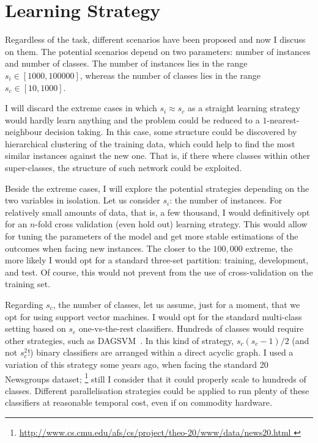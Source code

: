 \documentclass[11pt]{article}
\begin{document}
\section{Learning Strategy}
\label{sec:learning}
Regardless of the task, different scenarios have been proposed and now I discuss 
on them. The potential scenarios depend on two parameters: number of instances 
and number of classes. The number of instances lies in the range $s_i\in [1000, 
100000]$, whereas the number of classes lies in the range $s_c\in [10, 1000]$. 

I will discard the extreme cases in which $s_i\approx s_c$ as a straight 
learning strategy would hardly learn anything and the problem could be reduced 
to a $1$-nearest-neighbour decision taking. In this case, some structure could 
be discovered by hierarchical clustering of the training data, which could help 
to find the most similar instances against the new one. That is, if there 
where classes within other super-classes, the structure of such network could 
be exploited.

Beside the extreme cases, I will explore the potential strategies depending on 
the two variables in isolation. Let us consider $s_i$: the number of instances. 
For relatively small amounts of data, that is, a few thousand, I would 
definitively opt for an $n$-fold cross validation (even hold out) learning 
strategy. This would allow for tuning the 
parameters of the model and get more stable estimations of the outcomes when 
facing new instances. The closer to the $100,000$ extreme, the more likely I 
would opt for a standard three-set partition: training, development, and test. 
Of course, this would not prevent from the use of cross-validation on the 
training set. 

Regarding $s_c$, the number of classes, let us assume, just for a moment, that 
we opt for using support vector machines. I would opt for the standard 
multi-class setting based on $s_c$ one-vs-the-rest classifiers. Hundreds of 
classes would require other strategies, such as 
DAGSVM~\cite{large-margin-dags-for-multiclass-classification}. In this kind of 
strategy, $s_c(s_c-1)/2$ (and not $s_c^2$!) binary classifiers are arranged 
within a direct acyclic graph. I used a variation of this strategy some years 
ago, when facing the standard 20 Newsgroups dataset;%
\footnote{\url{http://www.cs.cmu.edu/afs/cs/project/theo-20/www/data/news20.html
}}
still I consider that it could properly scale to hundreds of classes. Different 
parallelisation strategies could be applied to run plenty of these classifiers 
at reasonable temporal cost, even if on commodity hardware.
\end{document}
